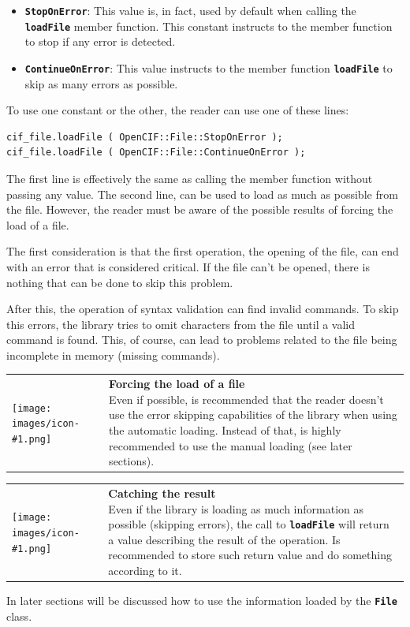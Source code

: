 \documentclass[11pt,twoside,openany,x11names,svgnames]{memoir}
\makeatletter
\newcommand{\IconNote}[3]
{
	\begin{table}[ht]
	\begin{tabular}{ lm{\dimexpr\textwidth-8\tabcolsep-\wd0}@{}}
		\toprule
		\texttt{[image: images/icon-\#1.png]}
		&
		\parbox[t]{155mm}{
		\textbf{#2} \\
		#3
		}
	\end{tabular}
\end{table}
}
\makeatother
\begin{document}
\begin{itemize}
	\item \textbf{\texttt{StopOnError}}: This value is, in fact, used by default when calling the \textbf{\texttt{loadFile}} member function. This constant instructs to the member function to stop if any error is detected.
	
	\item \textbf{\texttt{ContinueOnError}}: This value instructs to the member function \textbf{\texttt{loadFile}} to skip as many errors as possible.
\end{itemize}

To use one constant or the other, the reader can use one of these lines:

\begin{lstlisting}[frame=single,style=CPPStyle]
cif_file.loadFile ( OpenCIF::File::StopOnError );
cif_file.loadFile ( OpenCIF::File::ContinueOnError );
\end{lstlisting}

The first line is effectively the same as calling the member function without passing any value. The second line, can be used to load as much as possible from the file. However, the reader must be aware of the possible results of forcing the load of a file.

The first consideration is that the first operation, the opening of the file, can end with an error that is considered critical. If the file can't be opened, there is nothing that can be done to skip this problem.

After this, the operation of syntax validation can find invalid commands. To skip this errors, the library tries to omit characters from the file until a valid command is found. This, of course, can lead to problems related to the file being incomplete in memory (missing commands).

\IconNote
	{error}
	{Forcing the load of a file}
	{Even if possible, is recommended that the reader doesn't use the error skipping capabilities of the library when using the automatic loading. Instead of that, is highly recommended to use the manual loading (see later sections).}
	
\IconNote
	{info}
	{Catching the result}
	{Even if the library is loading as much information as possible (skipping errors), the call to \textbf{\texttt{loadFile}} will return a value describing the result of the operation. Is recommended to store such return value and do something according to it.}
	
In later sections will be discussed how to use the information loaded by the \textbf{\texttt{File}} class.
\end{document}
